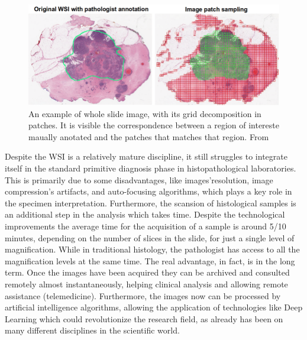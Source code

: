     \begin{figure}
        \centering
        \includegraphics[width = \textwidth]{images/patches_grid}
        \caption{An example of whole slide image, with its grid decomposition in patches. It is visible the correspondence between a region of intereste maually anotated and the patches that matches that region. From \cite{WSI_grid}}
        \label{fig:patches_grid}
    \end{figure}

    Despite the WSI is a relatively mature discipline, it still struggles to integrate itself in the standard primitive diagnosis phase in histopathological laboratories. This is primarily due to some disadvantages, like images'resolution, image compression's artifacts, and auto-focusing algorithms, which plays a key role in the specimen interpretation. Furthermore, the scansion of histological samples is an additional step in the analysis which takes time. Despite the technological improvements the average time for the acquisition of a sample is around 5/10 minutes, depending on the number of slices in the slide, for just a single level of magnification. While in traditional histology, the pathologist has access to all the magnification levels at the same time. The real advantage, in fact, is in the long term. Once the images have been acquired they can be archived and consulted remotely almost instantaneously, helping clinical analysis and allowing remote assistance (telemedicine). Furthermore, the images now can be processed by artificial intelligence algorithms, allowing the application of technologies like Deep Learning which could revolutionize the research field, as already has been on many different disciplines in the scientific world.

